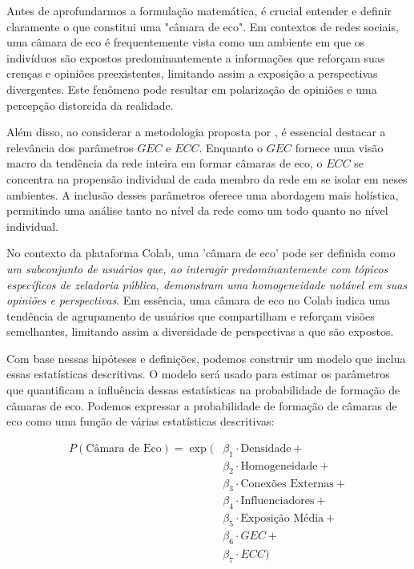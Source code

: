 Antes de aprofundarmos a formulação matemática, é crucial entender e definir claramente o que constitui uma "câmara de eco". Em contextos de redes sociais, uma câmara de eco é frequentemente vista como um ambiente em que os indivíduos são expostos predominantemente a informações que reforçam suas crenças e opiniões preexistentes, limitando assim a exposição a perspectivas divergentes. Este fenômeno pode resultar em polarização de opiniões e uma percepção distorcida da realidade. 

Além disso, ao considerar a metodologia proposta por , é essencial destacar a relevância dos parâmetros $GEC$ e $ECC$. Enquanto o $GEC$ fornece uma visão macro da tendência da rede inteira em formar câmaras de eco, o $ECC$ se concentra na propensão individual de cada membro da rede em se isolar em neses ambientes. A inclusão desses parâmetros oferece uma abordagem mais holística, permitindo uma análise tanto no nível da rede como um todo quanto no nível individual.

No contexto da plataforma Colab, uma 'câmara de eco' pode ser definida como \textit{um subconjunto de usuários que, ao interagir predominantemente com tópicos específicos de zeladoria pública, demonstram uma homogeneidade notável em suas opiniões e perspectivas}. Em essência, uma câmara de eco no Colab indica uma tendência de agrupamento de usuários que compartilham e reforçam visões semelhantes, limitando assim a diversidade de perspectivas a que são expostos.

Com base nessas hipóteses e definições, podemos construir um modelo que inclua essas estatísticas descritivas. O modelo será usado para estimar os parâmetros que quantificam a influência dessas estatísticas na probabilidade de formação de câmaras de eco. Podemos expressar a probabilidade de formação de câmaras de eco como uma função de várias estatísticas descritivas:

\begin{equation}
	\begin{split}
		P(\text{{Câmara de Eco}}) = \exp(&\beta_1 \cdot \text{{Densidade}} + \\
		&\beta_2 \cdot \text{{Homogeneidade}} + \\
		&\beta_3 \cdot \text{{Conexões Externas}} + \\
		&\beta_4 \cdot \text{{Influenciadores}} + \\
		&\beta_5 \cdot \text{{Exposição Média}} + \\
		&\beta_6 \cdot \text{{$GEC$}} + \\
		&\beta_7 \cdot \text{{$ECC$}})
	\end{split}
\end{equation}

